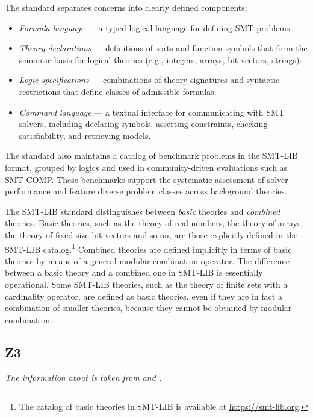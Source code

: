 The standard separates concerns into clearly defined components:
\begin{itemize}
    \item \emph{Formula language} — a typed logical language for defining SMT problems.
    \item \emph{Theory declarations} — definitions of sorts and function symbols that form the semantic basis for logical theories (e.g., integers, arrays, bit vectors, strings).
    \item \emph{Logic specifications} — combinations of theory signatures and syntactic restrictions that define classes of admissible formulas.
    \item \emph{Command language} — a textual interface for communicating with SMT solvers, including declaring symbols, asserting constraints, checking satisfiability, and retrieving models.
\end{itemize}

The standard also maintains a catalog of benchmark problems in the SMT-LIB format, grouped by logics and used in community-driven evaluations such as SMT-COMP.
These benchmarks support the systematic assessment of solver performance and feature diverse problem classes across background theories.

The SMT-LIB standard distinguishes between \emph{basic} theories and \emph{combined} theories.
Basic theories, such as the theory of real numbers, the theory of arrays, the theory of fixed-size bit vectors and so on, are those explicitly defined in the SMT-LIB catalog.\footnote{The catalog of basic theories in SMT-LIB is available at \url{https://smt-lib.org}.}
Combined theories are defined implicitly in terms of basic theories by means of a general modular combination operator.
The difference between a basic theory and a combined one in SMT-LIB is essentially operational.
Some SMT-LIB theories, such as the theory of finite sets with a cardinality operator, are defined as basic theories, even if they are in fact a combination of smaller theories, because they cannot be obtained by modular combination.

\subsection{Z3}
\label{sec:z3}

\textit{The information about \ziii is taken from \cite{z3} and \cite{z3:web}.}

